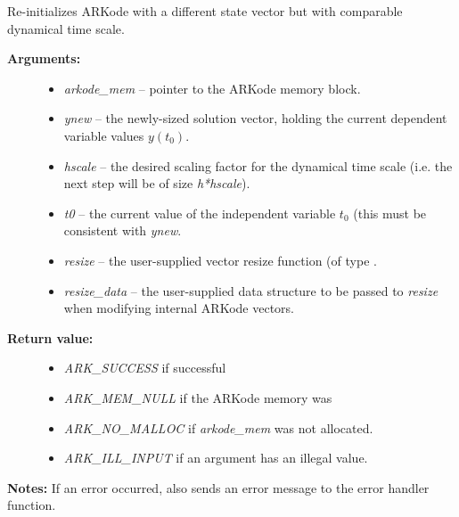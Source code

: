 \documentclass[letterpaper,10pt,english]{sphinxmanual}
\begin{document}
\begin{fulllineitems}
\label{c_interface/User_callable:c.ARKodeResize}
Re-initializes ARKode with a different state vector but with
comparable dynamical time scale.
\begin{description}
\item[{\textbf{Arguments:}}] \leavevmode\begin{itemize}
\item {} 
\emph{arkode\_mem} -- pointer to the ARKode memory block.

\item {} 
\emph{ynew} -- the newly-sized solution vector, holding the current
dependent variable values \(y(t_0)\).

\item {} 
\emph{hscale} -- the desired scaling factor for the dynamical time
scale (i.e. the next step will be of size \emph{h*hscale}).

\item {} 
\emph{t0} -- the current value of the independent variable
\(t_0\) (this must be consistent with \emph{ynew}.

\item {} 
\emph{resize} -- the user-supplied vector resize function (of type
{\hyperref[c_interface/User_supplied:c.ARKVecResizeFn]{\emph{}}}.

\item {} 
\emph{resize\_data} -- the user-supplied data structure to be passed
to \emph{resize} when modifying internal ARKode vectors.

\end{itemize}

\item[{\textbf{Return value:}}] \leavevmode\begin{itemize}
\item {} 
\emph{ARK\_SUCCESS} if successful

\item {} 
\emph{ARK\_MEM\_NULL}  if the ARKode memory was 

\item {} 
\emph{ARK\_NO\_MALLOC} if \emph{arkode\_mem} was not allocated.

\item {} 
\emph{ARK\_ILL\_INPUT} if an argument has an illegal value.

\end{itemize}

\end{description}

\textbf{Notes:} If an error occurred, {\hyperref[c_interface/User_callable:c.ARKodeResize]{\emph{}}} also sends an error
message to the error handler function.

\end{fulllineitems}
\end{document}
